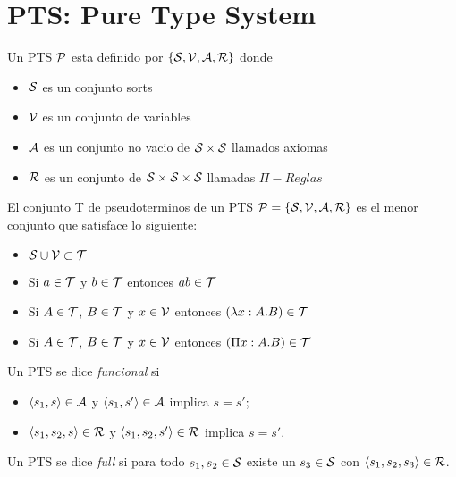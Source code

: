 \section{PTS: Pure Type System}

\begin{definition}[PTS]
Un PTS $\mathcal{P} $ esta definido por $\{ \mathcal{S}, \mathcal{V}, \mathcal{A}, \mathcal{R}\}$ donde

\begin{itemize}
    \item{$\mathcal{S}$} es un conjunto sorts
    \item{$\mathcal{V}$} es un conjunto de variables
    \item{$\mathcal{A}$} es un conjunto no vacio de $\mathcal{S}\times\mathcal{S}$ llamados axiomas 
    \item{$\mathcal{R}$} es un conjunto de $\mathcal{S}\times\mathcal{S}\times\mathcal{S}$ llamadas $\Pi-Reglas$ 
\end{itemize}
\end{definition}

\begin{definition}[Pseudotérminos]
El conjunto T de pseudoterminos de un PTS $ \mathcal{P} = \{ \mathcal{S}, \mathcal{V}, \mathcal{A}, \mathcal{R}\}$ 
es el menor conjunto que satisface lo siguiente:
\begin{itemize}
    \item{} $\mathcal{S} \cup \mathcal{V} \subset \mathcal{T}$
    \item{} Si $a \in \mathcal{T}$ y $b \in \mathcal{T}$ entonces $ab \in\mathcal{T}$
    \item{} Si $A \in \mathcal{T}$,  $B \in \mathcal{T}$  y $x \in \mathcal{V}$  entonces $(\lambda x:A.B) \in\mathcal{T}$
    \item{} Si $A \in \mathcal{T}$,  $B \in \mathcal{T}$  y $x \in \mathcal{V}$  entonces $(\Pi x:A.B) \in\mathcal{T}$
\end{itemize}
\end{definition}

\begin{definition}
Un PTS se dice \emph{funcional} si
\begin{itemize}
\item $\langle s_1, s \rangle \in \mathcal{A}$ y $\langle s_1, s'\rangle \in \mathcal{A}$ implica $s = s'$;
\item $\langle s_1, s_2, s\rangle \in \mathcal{R}$ y $\langle s_1, s_2, s' \rangle \in \mathcal{R}$ implica $s = s'$.
\end{itemize}
\end{definition}
\begin{definition}
Un PTS se dice \emph{full} si para todo $s_1, s_2 \in \mathcal{S}$
existe un $s_3 \in \mathcal{S}$ con $\langle s_1, s_2, s_3 \rangle \in \mathcal{R}$.
\end{definition}


